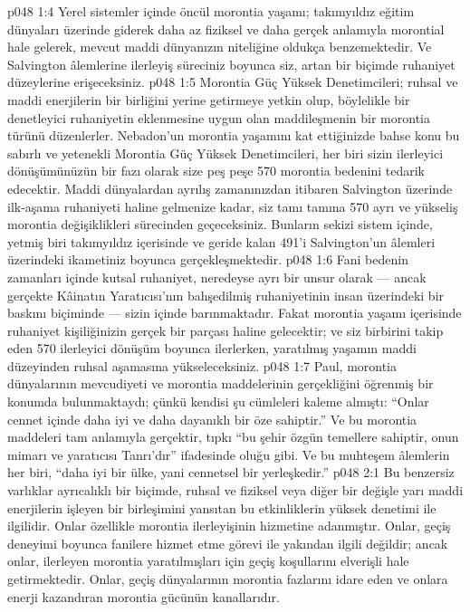 \vs p048 1:4 Yerel sistemler içinde öncül morontia yaşamı; takımyıldız eğitim dünyaları üzerinde giderek daha az fiziksel ve daha gerçek anlamıyla morontial hale gelerek, mevcut maddi dünyanızın niteliğine oldukça benzemektedir. Ve Salvington âlemlerine ilerleyiş süreciniz boyunca siz, artan bir biçimde ruhaniyet düzeylerine erişeceksiniz.
\vs p048 1:5 Morontia Güç Yüksek Denetimcileri; ruhsal ve maddi enerjilerin bir birliğini yerine getirmeye yetkin olup, böylelikle bir denetleyici ruhaniyetin eklenmesine uygun olan maddileşmenin bir morontia türünü düzenlerler. Nebadon’un morontia yaşamını kat ettiğinizde bahse konu bu sabırlı ve yetenekli Morontia Güç Yüksek Denetimcileri, her biri sizin ilerleyici dönüşümünüzün bir fazı olarak size peş peşe 570 morontia bedenini tedarik edecektir. Maddi dünyalardan ayrılış zamanınızdan itibaren Salvington üzerinde ilk\hyp{}aşama ruhaniyeti haline gelmenize kadar, siz tamı tamına 570 ayrı ve yükseliş morontia değişiklikleri sürecinden geçeceksiniz. Bunların sekizi sistem içinde, yetmiş biri takımyıldız içerisinde ve geride kalan 491’i Salvington’un âlemleri üzerindeki ikametiniz boyunca gerçekleşmektedir.
\vs p048 1:6 Fani bedenin zamanları içinde kutsal ruhaniyet, neredeyse ayrı bir unsur olarak --- ancak gerçekte Kâinatın Yaratıcısı’nın bahşedilmiş ruhaniyetinin insan üzerindeki bir baskını biçiminde --- sizin içinde barınmaktadır. Fakat morontia yaşamı içerisinde ruhaniyet kişiliğinizin gerçek bir parçası haline gelecektir; ve siz birbirini takip eden 570 ilerleyici dönüşüm boyunca ilerlerken, yaratılmış yaşamın maddi düzeyinden ruhsal aşamasına yükseleceksiniz.
\vs p048 1:7 Paul, morontia dünyalarının mevcudiyeti ve morontia maddelerinin gerçekliğini öğrenmiş bir konumda bulunmaktaydı; çünkü kendisi şu cümleleri kaleme almıştı: “Onlar cennet içinde daha iyi ve daha dayanıklı bir öze sahiptir.” Ve bu morontia maddeleri tam anlamıyla gerçektir, tıpkı “bu şehir özgün temellere sahiptir, onun mimarı ve yaratıcısı Tanrı’dır” ifadesinde oluğu gibi. Ve bu muhteşem âlemlerin her biri, “daha iyi bir ülke, yani cennetsel bir yerleşkedir.”
\vs p048 2:1 Bu benzersiz varlıklar ayrıcalıklı bir biçimde, ruhsal ve fiziksel veya diğer bir değişle yarı maddi enerjilerin işleyen bir birleşimini yansıtan bu etkinliklerin yüksek denetimi ile ilgilidir. Onlar özellikle morontia ilerleyişinin hizmetine adanmıştır. Onlar, geçiş deneyimi boyunca fanilere hizmet etme görevi ile yakından ilgili değildir; ancak onlar, ilerleyen morontia yaratılmışları için geçiş koşullarını elverişli hale getirmektedir. Onlar, geçiş dünyalarının morontia fazlarını idare eden ve onlara enerji kazandıran morontia gücünün kanallarıdır.
